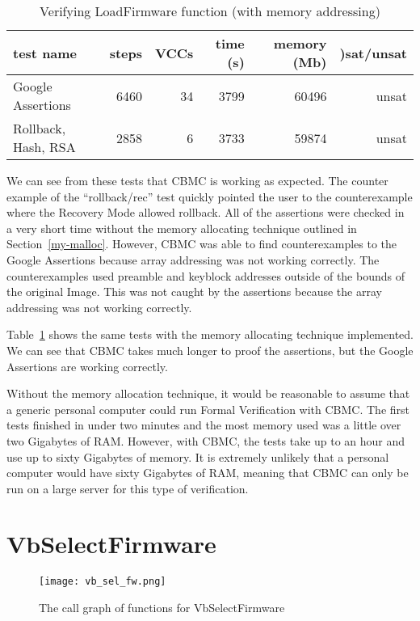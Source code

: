 \begin{table}[!htbp]
    \centering
    \caption{Verifying LoadFirmware function (with memory addressing)}\label{ldfw_results_malloc}
    \begin{tabular}{lrrrrr}
        \toprule
        test name & steps & VCCs  & time (s) & memory (Mb) &)sat/unsat  \\ \midrule
        Google Assertions & 6460 & 34 & 3799 & 60496 & unsat \\
        Rollback, Hash, RSA & 2858 & 6 & 3733 & 59874 & unsat \\\bottomrule
    \end{tabular}
\end{table}

We can see from these tests that CBMC is working as expected.
The counter example of the ``rollback/rec'' test quickly pointed the user to the counterexample where the Recovery Mode allowed rollback.
All of the assertions were checked in a very short time without the memory allocating technique outlined in Section~\ref{my-malloc}. 
However, CBMC was able to find counterexamples to the Google Assertions because array addressing was not working correctly.
The counterexamples used preamble and keyblock addresses outside of the bounds of the original Image.
This was not caught by the assertions because the array addressing was not working correctly.

Table~\ref{ldfw_results_malloc} shows the same tests with the memory allocating technique implemented.
We can see that CBMC takes much longer to proof the assertions, but the Google Assertions are working correctly.

Without the memory allocation technique, it would be reasonable to assume that a generic personal computer could run Formal Verification with CBMC. 
The first tests finished in under two minutes and the most memory used was a little over two Gigabytes of RAM.
However, with CBMC, the tests take up to an hour and use up to sixty Gigabytes of memory.
It is extremely unlikely that a personal computer would have sixty Gigabytes of RAM, meaning that CBMC can only be run on a large server for this type of verification. 

\section{VbSelectFirmware}

\begin{figure}[!htbp]
  \centering
  \texttt{[image: vb\_sel\_fw.png]}
  \caption[VbSelectFirmware Call Graph]{The call graph of functions for VbSelectFirmware}\label{fig:vbselfw}
\end{figure}

